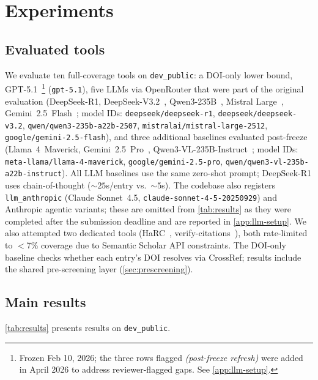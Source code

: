 \section{Experiments}
\label{sec:experiments}

\subsection{Evaluated tools}
\label{sec:baselines}

We evaluate ten full-coverage tools on \texttt{dev\_public}: a DOI-only lower bound, GPT-5.1~\citep{openai2025gpt5}\footnote{Frozen Feb 10, 2026; the three rows flagged \emph{(post-freeze refresh)} were added in April 2026 to address reviewer-flagged gaps. See \cref{app:llm-setup}.} (\texttt{gpt-5.1}), five LLMs via OpenRouter that were part of the original evaluation (DeepSeek-R1, DeepSeek-V3.2~\citep{deepseekv3}, Qwen3-235B~\citep{qwen3}, Mistral Large~\citep{mistral2025large}, Gemini~2.5~Flash~\citep{google2025gemini}; model IDs: \texttt{deepseek/deepseek-r1}, \texttt{deepseek/deepseek-v3.2}, \texttt{qwen/qwen3-235b-a22b-2507}, \texttt{mistralai/mistral-large-2512}, \texttt{google/gemini-2.5-flash}), and three additional baselines evaluated post-freeze (Llama~4~Maverick, Gemini~2.5~Pro~\citep{google2025gemini}, Qwen3-VL-235B-Instruct~\citep{qwen3}; model IDs: \texttt{meta-llama/llama-4-maverick}, \texttt{google/gemini-2.5-pro}, \texttt{qwen/qwen3-vl-235b-a22b-instruct}).
All LLM baselines use the same zero-shot prompt; DeepSeek-R1 uses chain-of-thought (${\sim}25$s/entry vs.\ ${\sim}5$s).
The codebase also registers \texttt{llm\_anthropic} (Claude Sonnet~4.5, \texttt{claude-sonnet-4-5-20250929}) and Anthropic agentic variants; these are omitted from \cref{tab:results} as they were completed after the submission deadline and are reported in \cref{app:llm-setup}.
We also attempted two dedicated tools (HaRC~\citep{harc2024}, verify-citations~\citep{verifycitations2025}), both rate-limited to $<$7\% coverage due to Semantic Scholar API constraints.
The DOI-only baseline checks whether each entry's DOI resolves via CrossRef; results include the shared pre-screening layer (\cref{sec:prescreening}).

\subsection{Main results}
\label{sec:main_results}

\cref{tab:results} presents results on \texttt{dev\_public}.

